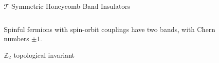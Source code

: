 \begin{frame}{$\mathcal{T}$-Symmetric Honeycomb Band Insulators}
\begin{columns}
\begin{column}[T]{0.65\textwidth}
\item<3-> Spinful fermions with spin-orbit couplings have two bands, with Chern numbers $\pm 1$.
\item<3-> $\mathbb{Z}_2$ topological invariant 
\vskip-0.3cm
\ei
\end{column}
\begin{column}[T]{0.35\textwidth}
\end{column}
\end{columns}
\end{frame}
